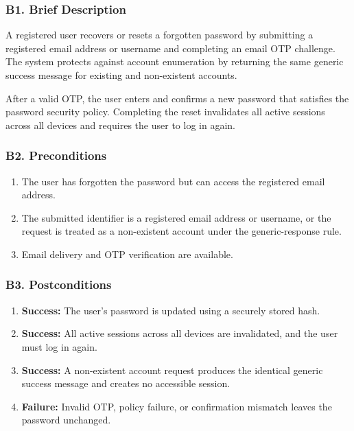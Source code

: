 \documentclass[12pt]{article}
\begin{document}
\hypertarget{sec:b1-brief-description}{}
\subsubsection*{B1. Brief Description}
\par\medskip

A registered user recovers or resets a forgotten password by submitting a registered email address or username and completing an email OTP challenge. The system protects against account enumeration by returning the same generic success message for existing and non-existent accounts.
\par\medskip

After a valid OTP, the user enters and confirms a new password that satisfies the password security policy. Completing the reset invalidates all active sessions across all devices and requires the user to log in again.
\par\medskip

\hypertarget{sec:b2-preconditions}{}
\subsubsection*{B2. Preconditions}
\par\medskip

\begin{enumerate}
\item The user has forgotten the password but can access the registered email address.
\item The submitted identifier is a registered email address or username, or the request is treated as a non-existent account under the generic-response rule.
\item Email delivery and OTP verification are available.
\end{enumerate}
\par\medskip

\hypertarget{sec:b3-postconditions}{}
\subsubsection*{B3. Postconditions}
\par\medskip

\begin{enumerate}
\item \textbf{Success:} The user's password is updated using a securely stored hash.
\item \textbf{Success:} All active sessions across all devices are invalidated, and the user must log in again.
\item \textbf{Success:} A non-existent account request produces the identical generic success message and creates no accessible session.
\item \textbf{Failure:} Invalid OTP, policy failure, or confirmation mismatch leaves the password unchanged.
\end{enumerate}
\par\medskip
\end{document}
